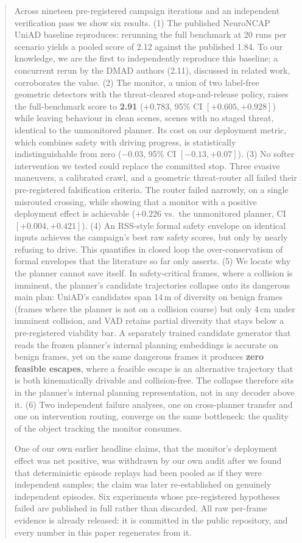 \documentclass[11pt]{article}
\begin{document}
\begin{abstract}
Across nineteen pre-registered campaign iterations and an independent verification pass we
show six results. (1) The published NeuroNCAP UniAD baseline reproduces: rerunning the full
benchmark at 20 runs per scenario yields a pooled score of 2.12 against the published 1.84. To
our knowledge, we are the first to independently reproduce this baseline; a concurrent rerun
by the DMAD authors (2.11), discussed in related work, corroborates the value. (2) The
monitor, a union of two label-free geometric detectors with the threat-cleared stop-and-release
policy, raises the full-benchmark score to \textbf{2.91} ($+0.783$, 95\% CI
$[+0.605, +0.928]$) while leaving behaviour in clean scenes, scenes with no staged threat,
identical to the unmonitored planner. Its cost on our deployment metric, which combines safety with driving
progress, is statistically indistinguishable from zero ($-0.03$, 95\% CI $[-0.13, +0.07]$).
(3) No softer intervention we tested could replace the committed stop. Three evasive
maneuvers, a calibrated crawl, and a geometric threat-router all failed their pre-registered
falsification criteria. The router failed narrowly, on a single misrouted crossing, while
showing that a monitor with a positive deployment effect is achievable ($+0.226$ vs.\ the
unmonitored planner, CI $[+0.004, +0.421]$). (4) An RSS-style formal safety envelope on
identical inputs achieves the campaign's best raw safety scores, but only by nearly refusing
to drive. This quantifies in closed loop the over-conservatism of formal envelopes that the
literature so far only asserts. (5) We locate why the planner cannot save itself. In
safety-critical frames, where a collision is imminent, the planner's candidate trajectories
collapse onto its dangerous main plan: UniAD's candidates span 14\,m of diversity on benign
frames (frames where the planner is not on a collision course) but only 4\,cm under imminent
collision, and VAD retains partial diversity that stays below a pre-registered viability bar.
A separately trained candidate generator that reads the frozen planner's internal planning
embeddings is accurate on benign frames, yet on the same dangerous frames it produces
\textbf{zero feasible escapes}, where a feasible escape is an alternative trajectory that is
both kinematically drivable and collision-free. The collapse therefore sits in the planner's
internal planning representation, not in any decoder above it. (6) Two independent failure
analyses, one on cross-planner transfer and one on intervention routing, converge on the same
bottleneck: the quality of the object tracking the monitor consumes.

One of our own earlier headline claims, that the monitor's deployment effect was net positive,
was withdrawn by our own audit after we found that deterministic episode replays had been
pooled as if they were independent samples; the claim was later re-established on genuinely
independent episodes. Six experiments whose pre-registered hypotheses failed are published in
full rather than discarded. All raw per-frame evidence is already released: it is committed in
the public repository, and every number in this paper regenerates from it.
\end{abstract}
\end{document}
